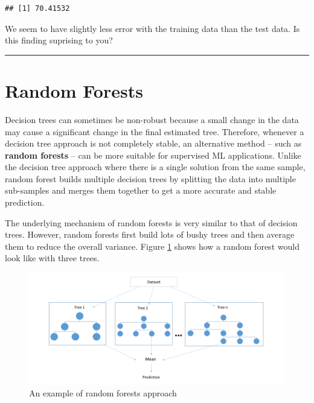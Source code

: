\documentclass[]{book}
\begin{document}
\begin{verbatim}
## [1] 70.41532
\end{verbatim}

We seem to have slightly less error with the training data than the test data. Is this finding suprising to you?

\begin{center}\rule{0.5\linewidth}{\linethickness}\end{center}

\hypertarget{random-forests}{%
\section{Random Forests}\label{random-forests}}

Decision trees can sometimes be non-robust because a small change in the data may cause a significant change in the final estimated tree. Therefore, whenever a decision tree approach is not completely stable, an alternative method -- such as \textbf{random forests} -- can be more suitable for supervised ML applications. Unlike the decision tree approach where there is a single solution from the same sample, random forest builds multiple decision trees by splitting the data into multiple sub-samples and merges them together to get a more accurate and stable prediction.

The underlying mechanism of random forests is very similar to that of decision trees. However, random forests first build lots of bushy trees and then average them to reduce the overall variance. Figure \ref{fig:fig6-2} shows how a random forest would look like with three trees.

\begin{figure}
\includegraphics[width=1\linewidth]{images/randomforest} \caption{An example of random forests approach}\label{fig:fig6-2}
\end{figure}
\end{document}
